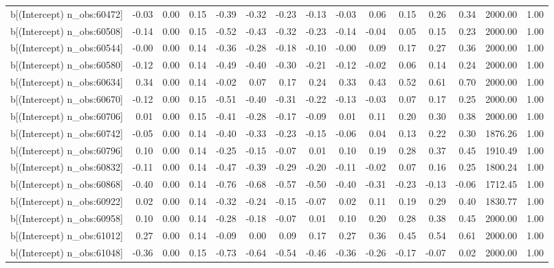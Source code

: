 \begin{table}[ht]
\begin{tabular}{rrrrrrrrrrrrrrr}
  b[(Intercept) n\_obs:60472] & -0.03 & 0.00 & 0.15 & -0.39 & -0.32 & -0.23 & -0.13 & -0.03 & 0.06 & 0.15 & 0.26 & 0.34 & 2000.00 & 1.00 \\ 
  b[(Intercept) n\_obs:60508] & -0.14 & 0.00 & 0.15 & -0.52 & -0.43 & -0.32 & -0.23 & -0.14 & -0.04 & 0.05 & 0.15 & 0.23 & 2000.00 & 1.00 \\ 
  b[(Intercept) n\_obs:60544] & -0.00 & 0.00 & 0.14 & -0.36 & -0.28 & -0.18 & -0.10 & -0.00 & 0.09 & 0.17 & 0.27 & 0.36 & 2000.00 & 1.00 \\ 
  b[(Intercept) n\_obs:60580] & -0.12 & 0.00 & 0.14 & -0.49 & -0.40 & -0.30 & -0.21 & -0.12 & -0.02 & 0.06 & 0.14 & 0.24 & 2000.00 & 1.00 \\ 
  b[(Intercept) n\_obs:60634] & 0.34 & 0.00 & 0.14 & -0.02 & 0.07 & 0.17 & 0.24 & 0.33 & 0.43 & 0.52 & 0.61 & 0.70 & 2000.00 & 1.00 \\ 
  b[(Intercept) n\_obs:60670] & -0.12 & 0.00 & 0.15 & -0.51 & -0.40 & -0.31 & -0.22 & -0.13 & -0.03 & 0.07 & 0.17 & 0.25 & 2000.00 & 1.00 \\ 
  b[(Intercept) n\_obs:60706] & 0.01 & 0.00 & 0.15 & -0.41 & -0.28 & -0.17 & -0.09 & 0.01 & 0.11 & 0.20 & 0.30 & 0.38 & 2000.00 & 1.00 \\ 
  b[(Intercept) n\_obs:60742] & -0.05 & 0.00 & 0.14 & -0.40 & -0.33 & -0.23 & -0.15 & -0.06 & 0.04 & 0.13 & 0.22 & 0.30 & 1876.26 & 1.00 \\ 
  b[(Intercept) n\_obs:60796] & 0.10 & 0.00 & 0.14 & -0.25 & -0.15 & -0.07 & 0.01 & 0.10 & 0.19 & 0.28 & 0.37 & 0.45 & 1910.49 & 1.00 \\ 
  b[(Intercept) n\_obs:60832] & -0.11 & 0.00 & 0.14 & -0.47 & -0.39 & -0.29 & -0.20 & -0.11 & -0.02 & 0.07 & 0.16 & 0.25 & 1800.24 & 1.00 \\ 
  b[(Intercept) n\_obs:60868] & -0.40 & 0.00 & 0.14 & -0.76 & -0.68 & -0.57 & -0.50 & -0.40 & -0.31 & -0.23 & -0.13 & -0.06 & 1712.45 & 1.00 \\ 
  b[(Intercept) n\_obs:60922] & 0.02 & 0.00 & 0.14 & -0.32 & -0.24 & -0.15 & -0.07 & 0.02 & 0.11 & 0.19 & 0.29 & 0.40 & 1830.77 & 1.00 \\ 
  b[(Intercept) n\_obs:60958] & 0.10 & 0.00 & 0.14 & -0.28 & -0.18 & -0.07 & 0.01 & 0.10 & 0.20 & 0.28 & 0.38 & 0.45 & 2000.00 & 1.00 \\ 
  b[(Intercept) n\_obs:61012] & 0.27 & 0.00 & 0.14 & -0.09 & 0.00 & 0.09 & 0.17 & 0.27 & 0.36 & 0.45 & 0.54 & 0.61 & 2000.00 & 1.00 \\ 
  b[(Intercept) n\_obs:61048] & -0.36 & 0.00 & 0.15 & -0.73 & -0.64 & -0.54 & -0.46 & -0.36 & -0.26 & -0.17 & -0.07 & 0.02 & 2000.00 & 1.00 \\ 

\end{tabular}
\end{table}
